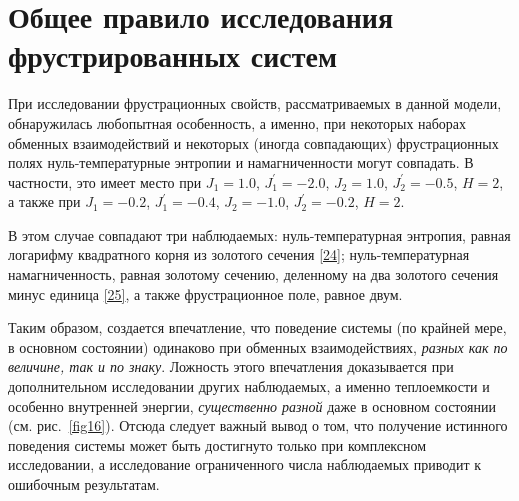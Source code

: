 

\section{Общее правило исследования фрустрированных систем}

При исследовании фрустрационных свойств, рассматриваемых в данной модели, обнаружилась любопытная особенность, а именно, при некоторых наборах обменных взаимодействий и некоторых (иногда совпадающих) фрустрационных полях нуль-температурные энтропии и намагниченности могут совпадать. В частности, это имеет место при $J_1=1.0$, $J_1^{'}= -2.0$, $J_2=1.0$, $J_2^{'}= -0.5$, $H=2$, а также при  $J_1= -0.2$, $J_1^{'}= -0.4$, $J_2= -1.0$, $J_2^{'}= -0.2$, $H=2$. 

В этом случае совпадают три наблюдаемых: нуль-температурная энтропия, равная логарифму квадратного корня из золотого сечения \eqref{24}; нуль-температурная намагниченность, равная  золотому сечению, деленному на два золотого сечения минус единица  \eqref{25}, а также фрустрационное поле, равное двум.

Таким образом, создается впечатление, что поведение системы (по крайней мере, в основном состоянии) одинаково при обменных взаимодействиях, \emph{разных как по величине, так и по знаку}. Ложность этого впечатления доказывается при дополнительном исследовании других наблюдаемых, а именно теплоемкости и особенно внутренней энергии, \emph{существенно разной} даже в основном состоянии (см. рис.~\ref{fig16}). Отсюда следует важный вывод о том, что получение истинного поведения системы может быть достигнуто только при комплексном исследовании, а исследование ограниченного числа наблюдаемых приводит к ошибочным результатам.

